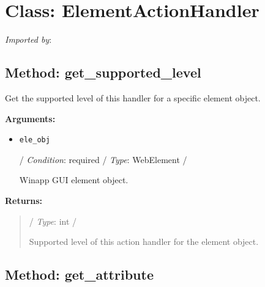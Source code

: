 %
%

\hypertarget{qconnectwinapp-actionhandlers-element-handler-elementactionhandler}{%
\section{Class: ElementActionHandler}\label{qconnectwinapp-actionhandlers-element-handler-elementactionhandler}}

\emph{Imported by}:

\begin{Shaded}
\begin{Highlighting}[]
\end{Highlighting}
\end{Shaded}

\hypertarget{qconnectwinapp-actionhandlers-element-handler-elementactionhandler-get-supported-level}{%
\subsection{Method: get\_supported\_level}\label{qconnectwinapp-actionhandlers-element-handler-elementactionhandler-get-supported-level}}

Get the supported level of this handler for a specific element object.

\textbf{Arguments:}

\begin{itemize}
\item
  \texttt{ele\_obj}

  / \emph{Condition}: required / \emph{Type}: WebElement /

  Winapp GUI element object.
\end{itemize}

\textbf{Returns:}

\begin{quote}
/ \emph{Type}: int /

Supported level of this action handler for the element object.
\end{quote}

\hypertarget{qconnectwinapp-actionhandlers-element-handler-elementactionhandler-get-attribute}{%
\subsection{Method: get\_attribute}\label{qconnectwinapp-actionhandlers-element-handler-elementactionhandler-get-attribute}}

